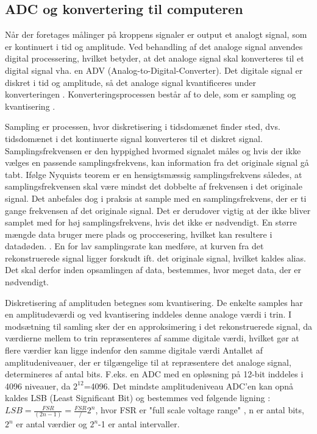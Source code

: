 \subsection{ADC og konvertering til computeren}
Når der foretages målinger på kroppens signaler er output et analogt signal, som er kontinuert i tid og amplitude. Ved behandling af det analoge signal anvendes digital processering, hvilket betyder, at det analoge signal skal konverteres til et digital signal vha. en ADV (Analog-to-Digital-Converter). Det digitale signal er diskret i tid og amplitude, så det analoge signal kvantificeres under konverteringen \cite{Webster2009}. Konverteringsprocessen består af to dele, som er sampling og kvantisering \cite{Zouridakis2003}.  

Sampling er processen, hvor diskretisering i tidsdomænet finder sted, dvs. tidsdomænet i det kontinuerte signal konverteres til et diskret signal. Samplingsfrekvensen er den hyppighed hvormed signalet måles og hvis der ikke vælges en passende samplingsfrekvens, kan information fra det originale signal gå tabt. Ifølge Nyquists teorem er en hensigtsmæssig samplingsfrekvens således, at samplingsfrekvensen skal være mindst det dobbelte af frekvensen i det originale signal. \cite{Zouridakis2003} Det anbefales dog i praksis at sample med en samplingsfrekvens, der er ti gange frekvensen af det originale signal. Det er derudover vigtig at der ikke bliver samplet med for høj samplingsfrekvens, hvis det ikke er nødvendigt. En større mængde data bruger mere plads og proccesering, hvilket kan resultere i datadøden. . En for lav samplingsrate kan medføre, at kurven fra det rekonstruerede signal ligger forskudt ift. det originale signal, hvilket kaldes alias. \cite{Zouridakis2003} Det skal derfor inden opsamlingen af data, bestemmes, hvor meget data, der er nødvendigt.
 
Diskretisering af amplituden betegnes som kvantisering. De enkelte samples har en amplitudeværdi og ved kvantisering inddeles denne analoge værdi i trin. I modsætning til samling sker der en approksimering i det rekonstruerede signal, da værdierne mellem to trin repræsenteres af samme digitale værdi, hvilket gør at flere værdier kan ligge indenfor den samme digitale værdi \cite{Zouridakis2003} Antallet af amplitudeniveauer, der er tilgængelige til at repræsentere det analoge signal, determineres af antal bits. F.eks. en ADC med en opløsning på 12-bit inddeles i 4096 niveauer, da $2^12$=4096. \cite{Konrad2006} Det mindste amplitudeniveau ADC'en kan opnå kaldes LSB (Least Significant Bit) og bestemmes ved følgende ligning : 
$LSB = \frac{FSR}{(2n-1)} = \frac{FSR}/{2^n}$, hvor FSR er "full scale voltage range" , n er antal bits, $2^n$ er antal værdier og $2^n$-1 er antal intervaller. 

